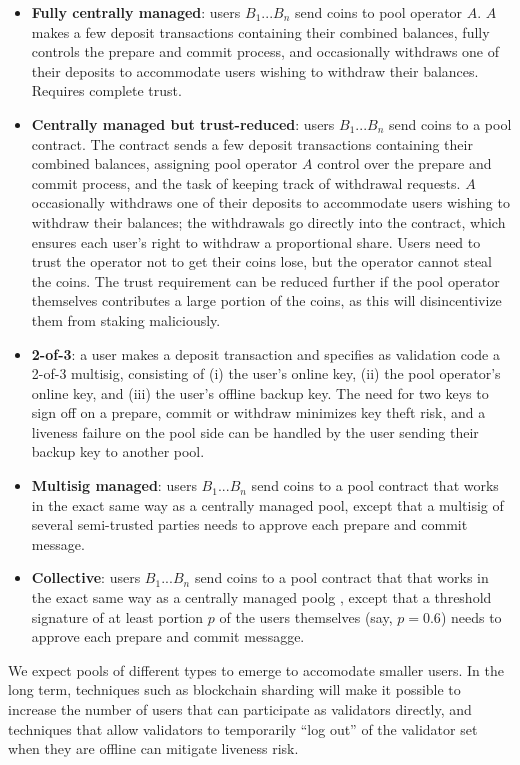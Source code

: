 \documentclass[12pt]{article}
\begin{document}
\begin{itemize}
\item \textbf{Fully centrally managed}: users $B_1 ... B_n$ send coins to pool operator $A$. $A$ makes a few deposit transactions containing their combined balances, fully controls the prepare and commit process, and occasionally withdraws one of their deposits to accommodate users wishing to withdraw their balances. Requires complete trust.
\item \textbf{Centrally managed but trust-reduced}: users $B_1 ... B_n$ send coins to a pool contract. The contract sends a few deposit transactions containing their combined balances, assigning pool operator $A$ control over the prepare and commit process, and the task of keeping track of withdrawal requests. $A$ occasionally withdraws one of their deposits to accommodate users wishing to withdraw their balances; the withdrawals go directly into the contract, which ensures each user's right to withdraw a proportional share. Users need to trust the operator not to get their coins lose, but the operator cannot steal the coins. The trust requirement can be reduced further if the pool operator themselves contributes a large portion of the coins, as this will disincentivize them from staking maliciously.
\item \textbf{2-of-3}: a user makes a deposit transaction and specifies as validation code a 2-of-3 multisig, consisting of (i) the user's online key, (ii) the pool operator's online key, and (iii) the user's offline backup key. The need for two keys to sign off on a prepare, commit or withdraw minimizes key theft risk, and a liveness failure on the pool side can be handled by the user sending their backup key to another pool.
\item \textbf{Multisig managed}: users $B_1 ... B_n$ send coins to a pool contract that works in the exact same way as a centrally managed pool, except that a multisig of several semi-trusted parties needs to approve each prepare and commit message.
\item \textbf{Collective}: users $B_1 ... B_n$ send coins to a pool contract that that works in the exact same way as a centrally managed poolg
, except that a threshold signature of at least portion $p$ of the users themselves (say, $p = 0.6$) needs to approve each prepare and commit messagge.
\end{itemize}

We expect pools of different types to emerge to accomodate smaller users. In the long term, techniques such as blockchain sharding will make it possible to increase the number of users that can participate as validators directly, and techniques that allow validators to temporarily ``log out'' of the validator set when they are offline can mitigate liveness risk.
\end{document}
